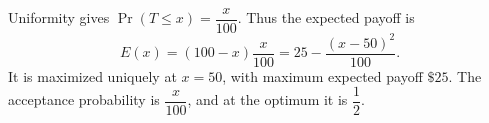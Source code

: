 Uniformity gives $\Pr(T\le x)=\dfrac{x}{100}$. Thus the expected payoff is
\[
E(x)=(100-x)\dfrac{x}{100}
=25-\dfrac{(x-50)^2}{100}.
\]
It is maximized uniquely at $\boxed{x=50}$, with maximum expected payoff $\boxed{\$25}$. The acceptance probability is $\boxed{\dfrac{x}{100}}$, and at the optimum it is $\dfrac{1}{2}$.
